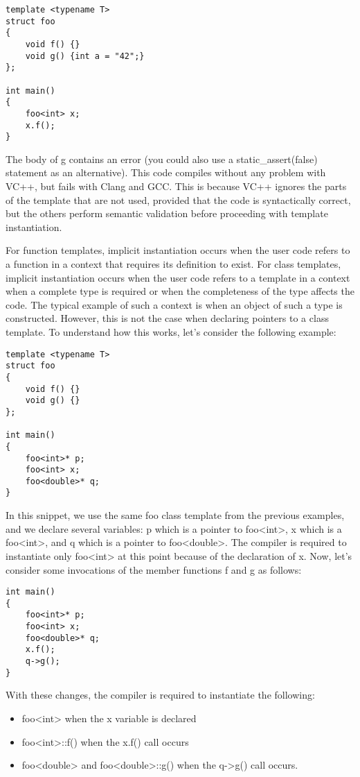\begin{lstlisting}[style=styleCXX]
template <typename T>
struct foo
{
	void f() {}
	void g() {int a = "42";}
};

int main()
{
	foo<int> x;
	x.f();
}
\end{lstlisting}

The body of g contains an error (you could also use a static\_assert(false) statement as an alternative). This code compiles without any problem with VC++, but fails with Clang and GCC. This is because VC++ ignores the parts of the template that are not used, provided that the code is syntactically correct, but the others perform semantic validation before proceeding with template instantiation.


For function templates, implicit instantiation occurs when the user code refers to a function in a context that requires its definition to exist. For class templates, implicit instantiation occurs when the user code refers to a template in a context when a complete type is required or when the completeness of the type affects the code. The typical example of such a context is when an object of such a type is constructed. However, this is not the case when declaring pointers to a class template. To understand how this works, let's consider the following example:

\begin{lstlisting}[style=styleCXX]
template <typename T>
struct foo
{
	void f() {}
	void g() {}
};

int main()
{
	foo<int>* p;
	foo<int> x;
	foo<double>* q;
}
\end{lstlisting}

In this snippet, we use the same foo class template from the previous examples, and we declare several variables: p which is a pointer to foo<int>, x which is a foo<int>, and q which is a pointer to foo<double>. The compiler is required to instantiate only foo<int> at this point because of the declaration of x. Now, let's consider some invocations of the member functions f and g as follows:

\begin{lstlisting}[style=styleCXX]
int main()
{
	foo<int>* p;
	foo<int> x;
	foo<double>* q;
	x.f();
	q->g();
}
\end{lstlisting}

With these changes, the compiler is required to instantiate the following:

\begin{itemize}
\item 
foo<int> when the x variable is declared

\item 
foo<int>::f() when the x.f() call occurs

\item 
foo<double> and foo<double>::g() when the q->g() call occurs.
\end{itemize}

